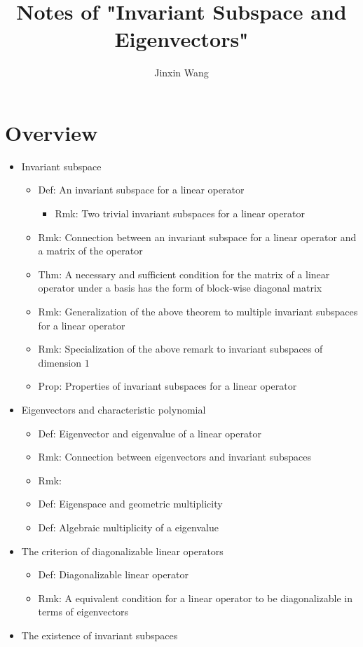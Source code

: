 \documentclass[onecolumn]{ctexart}
\title{Notes of "Invariant Subspace and Eigenvectors"}
\author{Jinxin Wang}
\date{}
\begin{document}
\maketitle

\section{Overview}
\begin{itemize}
  \item Invariant subspace
  \begin{itemize}
    \item Def: An invariant subspace for a linear operator
    \begin{itemize}
      \item Rmk: Two trivial invariant subspaces for a linear operator
    \end{itemize}
    \item Rmk: Connection between an invariant subspace for a linear operator and a matrix of the operator
    \item Thm: A necessary and sufficient condition for the matrix of a linear operator under a basis has the form of block-wise diagonal matrix
    \item Rmk: Generalization of the above theorem to multiple invariant subspaces for a linear operator
    \item Rmk: Specialization of the above remark to invariant subspaces of dimension $1$
    \item Prop: Properties of invariant subspaces for a linear operator
  \end{itemize}
  \item Eigenvectors and characteristic polynomial
  \begin{itemize}
    \item Def: Eigenvector and eigenvalue of a linear operator
    \item Rmk: Connection between eigenvectors and invariant subspaces
    \item Rmk: 
    \item Def: Eigenspace and geometric multiplicity
    \item Def: Algebraic multiplicity of a eigenvalue
  \end{itemize}
  \item The criterion of diagonalizable linear operators
  \begin{itemize}
    \item Def: Diagonalizable linear operator
    \item Rmk: A equivalent condition for a linear operator to be diagonalizable in terms of eigenvectors
  \end{itemize}
  \item The existence of invariant subspaces
\end{itemize}
\end{document}
